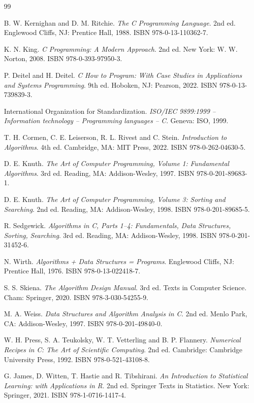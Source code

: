 \renewcommand{\bibname}{المراجع}
\begin{thebibliography}{99}

\begin{english}
 B. W. Kernighan and D. M. Ritchie.
    \emph{The C Programming Language}. 2nd ed. Englewood Cliffs, NJ: Prentice Hall, 1988.
    ISBN 978-0-13-110362-7.

 K. N. King.
    \emph{C Programming: A Modern Approach}. 2nd ed. New York: W. W. Norton, 2008.
    ISBN 978-0-393-97950-3.

 P. Deitel and H. Deitel.
    \emph{C How to Program: With Case Studies in Applications and Systems Programming}. 9th ed.
    Hoboken, NJ: Pearson, 2022. ISBN 978-0-13-739839-3.

 International Organization for Standardization.
    \emph{ISO/IEC 9899:1999 -- Information technology -- Programming languages -- C}. Geneva: ISO, 1999.

 T. H. Cormen, C. E. Leiserson, R. L. Rivest and C. Stein.
    \emph{Introduction to Algorithms}. 4th ed. Cambridge, MA: MIT Press, 2022.
    ISBN 978-0-262-04630-5.

 D. E. Knuth.
    \emph{The Art of Computer Programming, Volume 1: Fundamental Algorithms}. 3rd ed.
    Reading, MA: Addison-Wesley, 1997. ISBN 978-0-201-89683-1.

 D. E. Knuth.
    \emph{The Art of Computer Programming, Volume 3: Sorting and Searching}. 2nd ed.
    Reading, MA: Addison-Wesley, 1998. ISBN 978-0-201-89685-5.

 R. Sedgewick.
    \emph{Algorithms in C, Parts 1--4: Fundamentals, Data Structures, Sorting, Searching}. 3rd ed.
    Reading, MA: Addison-Wesley, 1998. ISBN 978-0-201-31452-6.

 N. Wirth.
    \emph{Algorithms + Data Structures = Programs}. Englewood Cliffs, NJ: Prentice Hall, 1976.
    ISBN 978-0-13-022418-7.

 S. S. Skiena.
    \emph{The Algorithm Design Manual}. 3rd ed. Texts in Computer Science. Cham: Springer, 2020.
    ISBN 978-3-030-54255-9.

 M. A. Weiss.
    \emph{Data Structures and Algorithm Analysis in C}. 2nd ed. Menlo Park, CA: Addison-Wesley, 1997.
    ISBN 978-0-201-49840-0.

 W. H. Press, S. A. Teukolsky, W. T. Vetterling and B. P. Flannery.
    \emph{Numerical Recipes in C: The Art of Scientific Computing}. 2nd ed.
    Cambridge: Cambridge University Press, 1992. ISBN 978-0-521-43108-8.

 G. James, D. Witten, T. Hastie and R. Tibshirani.
    \emph{An Introduction to Statistical Learning: with Applications in R}. 2nd ed.
    Springer Texts in Statistics. New York: Springer, 2021. ISBN 978-1-0716-1417-4.
\end{english}
\end{thebibliography}
